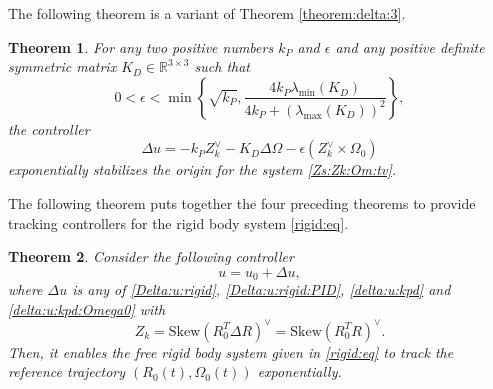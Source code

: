 \documentclass[letterpaper, 10 pt, conference]{ieeeconf}  %
\newtheorem{theorem}{Theorem}[section]
\newcommand{\Skew}{\mathrm{Skew}}
\begin{document}
%

The following theorem is a variant of Theorem \ref{theorem:delta:3}.
\begin{theorem}\label{theorem:delta:4}
For any two positive numbers $k_P$ and $\epsilon$ and any positive definite symmetric matrix $K_D \in \mathbb R^{3\times 3}$ such that
\[
0 < \epsilon < \min \left \{ \sqrt{k_P}, \frac{4k_P\lambda_{\min}(K_D)}{4k_P + (\lambda_{\max}(K_D))^2}\right \},
\]
 the controller
\begin{equation}\label{delta:u:kpd:Omega0}
\Delta u = -k_P Z_k^\vee - K_D \Delta \Omega - \epsilon (Z_k^\vee \times \Omega_0)
\end{equation}
exponentially stabilizes the origin for the system \eqref{Zs:Zk:Om:tv}. 

\end{theorem}

The following theorem puts together the four preceding theorems to provide tracking controllers for the rigid body system \eqref{rigid:eq}.
\begin{theorem}
Consider the following controller
\begin{equation}\label{THE:tracking:control:rigid}
u = u_0 + \Delta u,
\end{equation}
where $\Delta u$ is any of \eqref{Delta:u:rigid},  \eqref{Delta:u:rigid:PID}, \eqref{delta:u:kpd} and \eqref{delta:u:kpd:Omega0} with 
\[
Z_k = \Skew (R_0^T\Delta R)^\vee = \Skew(R_0^TR)^\vee.
\]
 Then, it enables the free rigid body system given in  \eqref{rigid:eq} to track the reference trajectory $(R_0(t), \Omega_0(t))$ exponentially.
\end{theorem}
\end{document}
